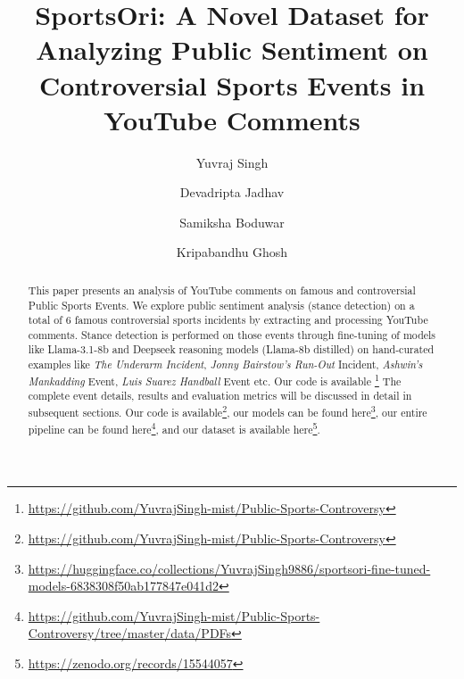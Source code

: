 \documentclass[sigconf, review]{acmart}
\begin{document}

\title{SportsOri: A Novel Dataset for Analyzing Public Sentiment on Controversial Sports Events in YouTube Comments}




\author{Yuvraj Singh}


\author{Devadripta Jadhav}

\author{Samiksha Boduwar}




\author{Kripabandhu Ghosh}
\renewcommand{\shortauthors}{Singh et al.}

\begin{abstract}
  This paper presents an analysis of YouTube comments on famous and controversial Public Sports Events. We explore public sentiment analysis (stance detection) on a total of 6 famous controversial sports incidents by extracting and processing YouTube comments. Stance detection is performed on those events through fine-tuning of models like Llama-3.1-8b and Deepseek reasoning models (Llama-8b distilled) on hand-curated examples like \textit{The Underarm Incident}, \textit{Jonny Bairstow's Run-Out} Incident, \textit{Ashwin's Mankadding} Event, \textit{Luis Suarez Handball} Event etc. Our code is available \footnote{\url{https://github.com/YuvrajSingh-mist/Public-Sports-Controversy}}
The complete event details,  results and evaluation metrics will be discussed in detail in subsequent sections. 
Our code is available\footnote{\url{https://github.com/YuvrajSingh-mist/Public-Sports-Controversy}}, 
our models can be found here\footnote{\url{https://huggingface.co/collections/YuvrajSingh9886/sportsori-fine-tuned-models-6838308f50ab177847e041d2}}, 
our entire pipeline can be found here\footnote{\url{https://github.com/YuvrajSingh-mist/Public-Sports-Controversy/tree/master/data/PDFs}}, 
and our dataset is available here\footnote{\url{https://zenodo.org/records/15544057}}.
  

\end{abstract}
\end{document}
